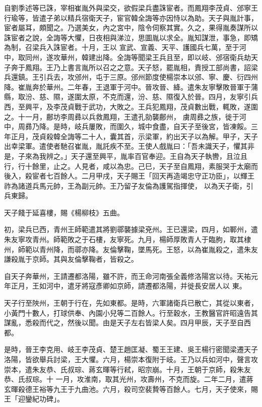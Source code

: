 \begin{pinyinscope}
 自劉季述等已誅，宰相崔胤外與梁交，欲假梁兵盡誅宦者。而鳳翔李茂貞、邠寧王行瑜等，皆遣子弟以精兵宿衛天子，宦官韓全誨等亦因恃以為助。天子與胤計事，宦者屬耳，頗聞之。乃選美女，內之宮中，陰令伺察其實。久之，果得胤奏謀所以誅宦者之說，全誨等大懼，日夜相與涕泣，思圖胤以求全。胤知謀泄，事急，即矯為制，召梁兵入誅宦者。十月，王以
 宣武、宣義、天平、護國兵七萬，至于河中，取同州，遂攻華州，韓建出降。全誨等聞梁王兵且至，即以岐、邠宿衛兵劫天子奔于鳳翔。王乃上書言胤所以召之之意。天子怒，罷胤相，責授工部尚書，詔梁兵還鎮。王引兵去，攻邠州，屯于三原。邠州節度使楊崇本以邠、寧、慶、衍四州降。崔胤奔於華州。二年春，王退軍于河中。晉攻晉、絳。遣朱友寧擊敗晉軍于蒲縣，取汾、慈、隰，遂圍太原，不克而還，汾、慈、隰復入於晉。四月，友寧引兵西，至興平，及李茂貞戰于武功，大敗之。王兵犯鳳翔，茂貞數出戰，輒敗，遂圍之。十一月，鄜坊李周彞以兵救鳳翔，王遣孔勍襲鄜州，
 虜周彞之族，徙于河中，周彞乃降。是時，岐兵屢敗，而圍久，城中食盡，自天子至後宮，皆凍餒。三年正月，茂貞殺韓全誨等二十人，囊其首，示梁軍，約出天子以為解。甲子，天子出幸梁軍。遣使者馳召崔胤，胤託疾不至。王使人戲胤曰：「吾未識天子，懼其非是，子來為我辨之。」天子還至興平，胤率百官奉迎。王自為天子執轡，且泣且行，行十餘里，止之。人見者，咸以為忠。己巳，天子至自鳳翔，素服哭于太廟而後入，殺宦者七百餘人。二月甲戌，天子賜王「回天再造竭忠守正功臣」，以輝王祚為諸道兵馬元帥，王為副元帥。王乃留子友倫為護駕指揮使，
 以為天子衛，引兵東歸。



 天子餞于延喜樓，賜《楊柳枝》五曲。



 初，梁兵已西，青州王師範遣其將劉鄩襲據梁兗州。王已還梁，四月，如鄆州，遣朱友寧攻青州。師範敗之于石樓，友寧死。九月，楊師厚敗青人于臨朐，取其棣州，師範以青州降，而鄩亦降。友倫擊鞠，墜馬死。王怒，以為崔胤殺之，遣朱友謙殺胤于京師。其與友倫擊鞠者，皆殺之。



 自天子奔華州，王請遷都洛陽，雖不許，而王命河南張全義修洛陽宮以待。天祐元年正月，王如河中，遣牙將寇彥卿如京師，請遷都洛陽，并徙長安居人以
 東。



 天子行至陜州，王朝于行在，先如東都。是時，六軍諸衛兵已散亡，其從以東者，小黃門十數人，打球供奉、內園小兒等二百餘人。行至穀水，王教醫官許昭遠告其謀亂，悉殺而代之，然後以聞。由是天子左右皆梁人矣。四月甲辰，天子至自西都。



 是時，晉王李克用、岐王李茂貞、楚王趙匡凝、蜀王王建、吳王楊行密聞梁遷天子洛陽，皆欲舉兵討梁，王大懼。六月，楊崇本復附于岐。王乃以兵如河中，聲言攻崇本，遣朱友恭、氏叔琮、蔣玄暉等行弒，昭宗崩。十月，王朝于京師，殺朱友恭、氏叔琮。十
 一月，攻淮南，取其光州，攻壽州，不克而旋。二年二月，遣蔣玄暉殺德王裕等九王于九曲池。六月，殺司空裴贄等百餘人。七月，天子使來，賜王「迎鑾紀功碑」。




\end{pinyinscope}
